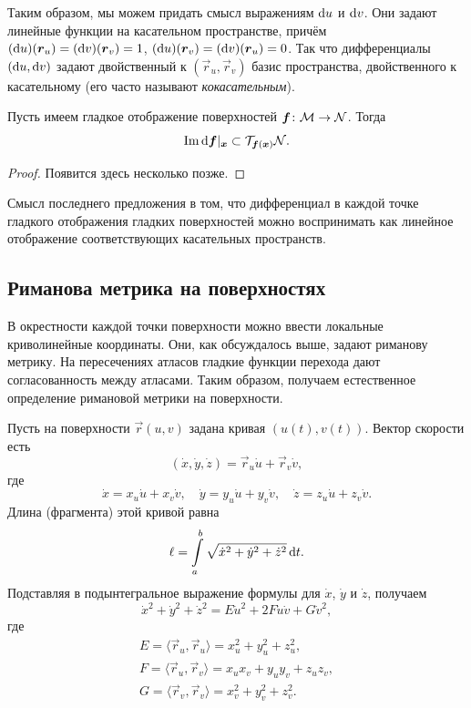 Таким образом, мы можем придать смысл выражениям $\mathop{}\!\mathrm{d} u$ и $\mathop{}\!\mathrm{d} v$. Они задают линейные функции на касательном пространстве, причём $(\mathop{}\!\mathrm{d} u)(\boldsymbol{r}_u) = (\mathop{}\!\mathrm{d} v)(\boldsymbol{r}_v) = 1$, $(\d u)(\vec{r}_v) \hm = (\d v)(\vec{r}_u) = 0$. Так что дифференциалы $(\mathop{}\!\mathrm{d} u, \mathop{}\!\mathrm{d} v)$ задают двойственный к $(\vec{r}_u, \vec{r}_v)$ базис пространства, двойственного к касательному (его часто называют \textit{кокасательным}).

\begin{proposition}
	Пусть имеем гладкое отображение поверхностей $\boldsymbol{f}\colon \mathcal{M} \to \mathcal{N}$. Тогда
	\[
		\operatorname{Im}\mathop{}\!\mathrm{d}\boldsymbol{f}|_{\boldsymbol{x}} \subset \mathcal{T}_{\boldsymbol{f}(\boldsymbol{x})}\mathcal{N}.
	\]
\end{proposition}

\begin{proof} %
	Появится здесь несколько позже.
\end{proof}

Смысл последнего предложения в том, что дифференциал в каждой точке гладкого отображения гладких поверхностей можно воспринимать как линейное отображение соответствующих касательных пространств.

\subsection{Риманова метрика на поверхностях}

В окрестности каждой точки поверхности можно ввести локальные криволинейные координаты. Они, как обсуждалось выше, задают риманову метрику. На пересечениях атласов гладкие функции перехода дают согласованность между атласами. Таким образом, получаем естественное определение римановой метрики на поверхности.

Пусть на поверхности $\vec{r}(u, v)$ задана кривая $(u(t), v(t))$. Вектор скорости есть
\[
	(\dot{x}, \dot{y}, \dot{z}) = \vec{r}_u\dot{u} + \vec{r}_v\dot{v},
\]
где
\[
	\dot{x} = x_u\dot{u} + x_v\dot{v},\quad
	\dot{y} = y_u\dot{u} + y_v\dot{v},\quad
	\dot{z} = z_u\dot{u} + z_v\dot{v}.
\]
Длина (фрагмента) этой кривой равна
\[
	\ell = \int\limits_a^b\sqrt{\dot{x}^2 + \dot{y}^2 + \dot{z}^2}\mathop{}\!\mathrm{d} t.
\]
Подставляя в подынтегральное выражение формулы для $\dot{x}$, $\dot{y}$ и $\dot{z}$, получаем
\[
	\dot{x}^2 + \dot{y}^2 + \dot{z}^2 = E\dot{u}^2 + 2F\dot{u}\dot{v} + G\dot{v}^2,
\]
где
\begin{gather*}
	E = \langle\vec{r}_u, \vec{r}_u\rangle = x_u^2 + y_u^2 + z_u^2,\\
	F = \langle\vec{r}_u, \vec{r}_v\rangle = x_ux_v + y_uy_v + z_uz_v,\\
	G = \langle\vec{r}_v, \vec{r}_v\rangle = x_v^2 + y_v^2 + z_v^2.
\end{gather*}

